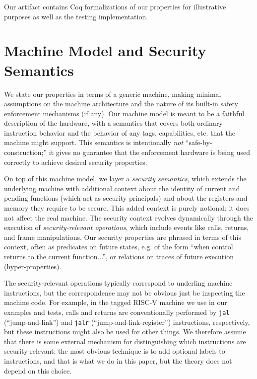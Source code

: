 \documentclass[10pt,conference]{ieeetran}%
\theoremstyle{definition}
\begin{document}
Our artifact contains Coq formalizations of our properties for illustrative purposes
as well as the testing implementation.

\section{Machine Model and Security Semantics}

  We state our properties in terms of a generic machine, making minimal assumptions
  on the machine architecture and the nature of its built-in safety enforcement mechanisms
  (if any).  Our machine model is meant to be a faithful description of the hardware,
  with a semantics that covers both ordinary instruction behavior and the behavior of
  any tags, capabilities, etc. that the machine might support. 
  This semantics is intentionally \emph{not} ``safe-by-construction;'' it gives
  no guarantee that the enforcement hardware is being used correctly to achieve desired
  security properties. 

  On top of this machine model, we layer a {\it security semantics}, which extends the
  underlying machine with additional context about the identity of current and pending
  functions (which act as security principals) and about the registers and memory they require
  to be secure. This added context is purely notional;
  it does not affect the real machine. The security context
  evolves dynamically through the execution of {\it security-relevant operations},
  which include events like calls, returns, and frame manipulations.
  Our security properties are phrased in terms of this context, often as predicates
  on future states, e.g. of the form ``when control returns to the current function...'',
  or relations on traces of future execution (hyper-properties).

  The security-relevant operations typically correspond to underling machine instructions,
  but the correspondence may not be obvious just be inspecting the machine code.
  For example, in the tagged RISC-V machine we use in our examples and tests,
  calls and returns are conventionally performed by {\tt jal} (``jump-and-link'')
  and {\tt jalr} (``jump-and-link-register'') instructions, respectively, but these
  instructions might also be used for other things. We therefore assume that there
  is some external mechanism for distinguishing which instructions are security-relevant;
  the most obvious technique is to add optional labels to instructions, and that is 
  what we do in this paper, but the theory does not depend on this choice.
\end{document}
